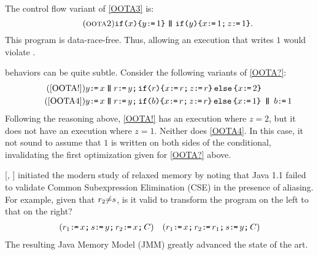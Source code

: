 The control flow variant of \ref{OOTA3} is:
\begin{displaymath}
  \label{cyc}\tag{\textsc{oota2}}
  \IF{x}\THEN y\GETS 1 \FI \!\PAR\! \IF{y}\THEN x\GETS 1 \SEMI z\GETS 1\FI.
\end{displaymath}
This program is data-race-free. Thus, allowing an execution that writes $1$
would violate \drfsc{}.


\oota{} behaviors can be quite subtle.
Consider the following variants of \eqref{OOTA?}:
\begin{align}
  \tag{\ref{OOTA!}}
    y\GETS x
  \PAR&
  r\GETS y\SEMI \IF{r}\THEN 
  x\GETS r\SEMI z\GETS r \ELSE x\GETS2 \FI
  \\
  \tag{\ref{OOTA4}}
  y\GETS x
  \PAR&
  r\GETS y \SEMI \IF{b}\THEN  x\GETS r \SEMI z\GETS r \ELSE x\GETS1 \FI
  \PAR
  b\GETS1
\end{align}
Following the reasoning above, \eqref{OOTA!} has an execution where
$z{=}2$, but it does not have an execution where $z{=}1$.   Neither does
\ref{OOTA4}.  In this case, it not sound to assume that  $1$ is
written on both sides of the conditional, invalidating the first optimization
given for \eqref{OOTA?} above.
  




\citeauthor{DBLP:conf/java/Pugh99} [\citeyear{DBLP:conf/java/Pugh99},
] initiated the modern study of relaxed memory by noting that
Java 1.1 failed to validate Common Subexpression Elimination (CSE) in the
presence of aliasing. For example, given that $r_2{\neq}s$, is it valid
to transform the program on the left to that on the right?
\begin{align*}
  ({r_1\texttt{:}\mkern-1mu\texttt{=}\, x \texttt{;}\,\allowbreak
  s\texttt{:}\mkern-1mu\texttt{=}\, y \texttt{;}\,\allowbreak  
  r_2\texttt{:}\mkern-1mu\texttt{=}\, x\texttt{;}\,\allowbreak C})
&&
  ({r_1\texttt{:}\mkern-1mu\texttt{=}\, x \texttt{;}\,\allowbreak     
    r_2\texttt{:}\mkern-1mu\texttt{=}\, r_1\texttt{;}\,\allowbreak
    s\texttt{:}\mkern-1mu\texttt{=}\, y \texttt{;}\,\allowbreak C})
\end{align*}
The resulting Java Memory Model (JMM) \cite{Manson:2005:JMM:1047659.1040336}
greatly advanced the state of the art.


